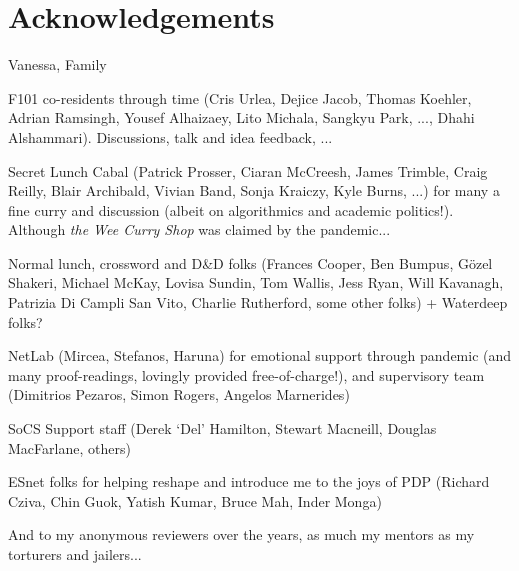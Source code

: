 \chapter*{Acknowledgements}

Vanessa, Family

F101 co-residents through time (Cris Urlea, Dejice Jacob, Thomas Koehler, Adrian Ramsingh, Yousef Alhaizaey, Lito Michala, Sangkyu Park, ..., Dhahi Alshammari). Discussions, talk and idea feedback, ...

Secret Lunch Cabal (Patrick Prosser, Ciaran McCreesh, James Trimble, Craig Reilly, Blair Archibald, Vivian Band, Sonja Kraiczy, Kyle Burns, ...) for many a fine curry and discussion (albeit on algorithmics and academic politics!). Although \emph{the Wee Curry Shop} was claimed by the pandemic...

Normal lunch, crossword and D\&D folks (Frances Cooper, Ben Bumpus, G\"{o}zel Shakeri, Michael McKay, Lovisa Sundin, Tom Wallis, Jess Ryan, Will Kavanagh, Patrizia Di Campli San Vito, Charlie Rutherford, some other folks) + Waterdeep folks?

NetLab (Mircea, Stefanos, Haruna) for emotional support through pandemic (and many proof-readings, lovingly provided free-of-charge!), and supervisory team (Dimitrios Pezaros, Simon Rogers, Angelos Marnerides)

SoCS Support staff (Derek `Del' Hamilton, Stewart Macneill, Douglas MacFarlane, others)

ESnet folks for helping reshape and introduce me to the joys of PDP (Richard Cziva, Chin Guok, Yatish Kumar, Bruce Mah, Inder Monga)

And to my anonymous reviewers over the years, as much my mentors as my torturers and jailers...